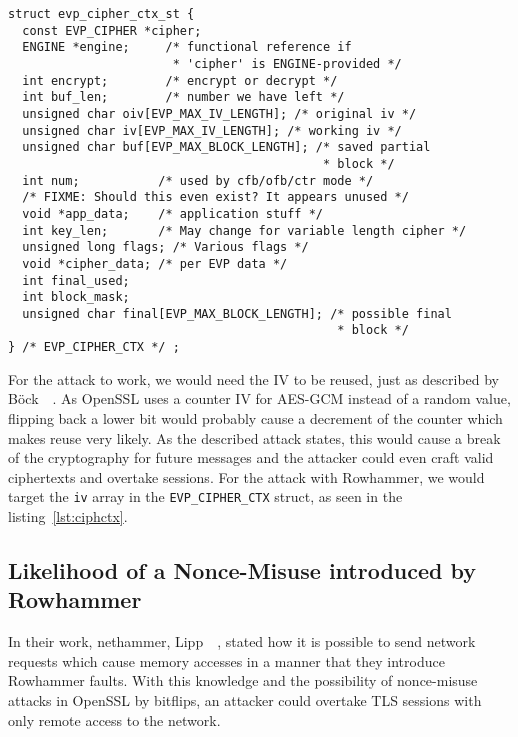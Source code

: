 \begin{minipage}{\linewidth}
\begin{lstlisting}[style=CStyle,
                   caption={Context struct describing the Cipher used in TLS.
This struct is used as the SSL context inside OpenSSL. Source is taken from
OpenSSL version $1.1.0g$},
                   label={lst:ciphctx}]
struct evp_cipher_ctx_st {
  const EVP_CIPHER *cipher;
  ENGINE *engine;     /* functional reference if
                       * 'cipher' is ENGINE-provided */
  int encrypt;        /* encrypt or decrypt */
  int buf_len;        /* number we have left */
  unsigned char oiv[EVP_MAX_IV_LENGTH]; /* original iv */
  unsigned char iv[EVP_MAX_IV_LENGTH]; /* working iv */
  unsigned char buf[EVP_MAX_BLOCK_LENGTH]; /* saved partial
                                            * block */
  int num;           /* used by cfb/ofb/ctr mode */
  /* FIXME: Should this even exist? It appears unused */
  void *app_data;    /* application stuff */
  int key_len;       /* May change for variable length cipher */
  unsigned long flags; /* Various flags */
  void *cipher_data; /* per EVP data */
  int final_used;
  int block_mask;
  unsigned char final[EVP_MAX_BLOCK_LENGTH]; /* possible final
                                              * block */
} /* EVP_CIPHER_CTX */ ;
\end{lstlisting}
\end{minipage}

For the attack to work, we would need the IV to be reused, just as described by
Böck~\etal~\cite{gcmnonceattack}. As OpenSSL uses a counter IV for AES-GCM
instead of a random value, flipping back a lower bit would probably cause a
decrement of the counter which makes reuse very likely. As the described attack
states, this would cause a break of the cryptography for future messages and the
attacker could even craft valid ciphertexts and overtake sessions. For the
attack with Rowhammer, we would target the \texttt{iv} array in the
\texttt{EVP\_CIPHER\_CTX} struct, as seen in the listing~\ref{lst:ciphctx}.

\subsection{Likelihood of a Nonce-Misuse introduced by Rowhammer}

In their work, nethammer, Lipp~\etal~\cite{nethammer}, stated how it is possible
to send network requests which cause memory accesses in a manner that they
introduce Rowhammer faults. With this knowledge and the possibility of
nonce-misuse attacks in OpenSSL by bitflips, an attacker could overtake TLS
sessions with only remote access to the network.

